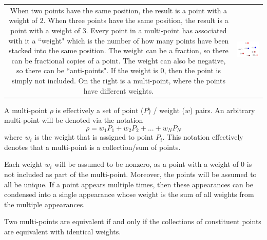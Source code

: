 \vspace{5mm}

\begin{tabular}{cc}
\parbox{0.5\textwidth}{
When two points have the same position, the result is a point with a weight of \(2\). When three points have the same position, the result is a point with a weight of \(3\). Every point in a multi-point has associated with it a ``weight" which is the number of how many points have been stacked into the same position. The weight can be a fraction, so there can be fractional copies of a point. The weight can also be negative, so there can be ``anti-points". If the weight is \(0\), then the point is simply not included. On the right is a multi-point, where the points have different weights.
} & \parbox{0.5\textwidth}{
\includegraphics[scale = 0.75]{Multi-structures/Multipoints/multi-point_multiplicity}
}
\end{tabular}

\vspace{2mm}

A multi-point \(\rho\) is effectively a set of point (\(P\)) / weight (\(w\)) pairs. An arbitrary multi-point will be denoted via the notation
\[\rho = w_1 P_1 + w_2 P_2 + ... + w_N P_N\]
where \(w_i\) is the weight that is assigned to point \(P_i\). This notation effectively denotes that a multi-point is a collection/sum of points.

Each weight \(w_i\) will be assumed to be nonzero, as a point with a weight of 0 is not included as part of the multi-point. Moreover, the points will be assumed to all be unique. If a point appears multiple times, then these appearances can be condensed into a single appearance whose weight is the sum of all weights from the multiple appearances. 

Two multi-points are equivalent if and only if the collections of constituent points are equivalent with identical weights. 




